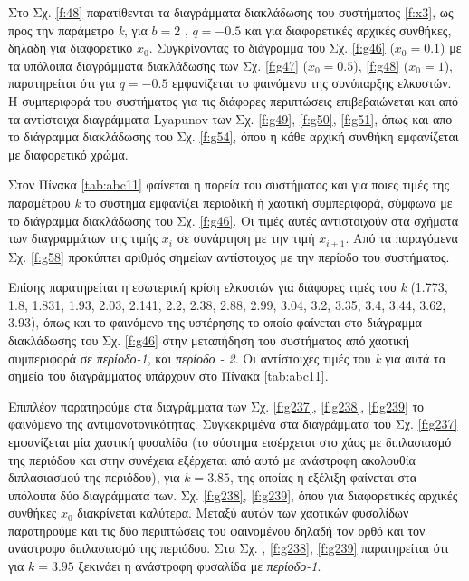 Στο Σχ. \ref{f:48} παρατίθενται τα διαγράμματα διακλάδωσης του συστήματος \ref{f:x3}, ως προς την παράμετρο \emph{k}, για $b = 2$ , $q =-0.5$ και για διαφορετικές αρχικές συνθήκες, δηλαδή για διαφορετικό \(x_0\). Συγκρίνοντας το διάγραμμα του Σχ. \ref{f:g46} (\(x_0=0.1\)) με τα υπόλοιπα διαγράμματα διακλάδωσης των Σχ. \ref{f:g47} (\(x_0=0.5\)), \ref{f:g48} (\(x_0=1\)), παρατηρείται ότι για $q=-0.5$ εμφανίζεται το φαινόμενο της συνύπαρξης ελκυστών. Η συμπεριφορά του συστήματος για τις διάφορες περιπτώσεις επιβεβαιώνεται και από τα αντίστοιχα διαγράμματα Lyapunov των Σχ. \ref{f:g49}, \ref{f:g50}, \ref{f:g51}, όπως και απο το διάγραμμα διακλάδωσης του Σχ. \ref{f:g54}, όπου η κάθε αρχική συνθήκη εμφανίζεται με διαφορετικό χρώμα.

Στον Πίνακα \ref{tab:abc11} φαίνεται η πορεία του συστήματος και για ποιες τιμές της παραμέτρου \emph{k} το σύστημα εμφανίζει περιοδική ή χαοτική συμπεριφορά, σύμφωνα με το διάγραμμα διακλάδωσης του Σχ. \ref{f:g46}. Οι τιμές αυτές αντιστοιχούν στα σχήματα των διαγραμμάτων της τιμής \(x_i\) σε συνάρτηση με την τιμή \(x_{i+1}\). Από τα παραγόμενα Σχ. \ref{f:g58} προκύπτει αριθμός σημείων αντίστοιχος με την περίοδο του συστήματος.

Επίσης παρατηρείται η εσωτερική κρίση ελκυστών για διάφορες τιμές του \emph{k} (1.773, 1.8, 1.831, 1.93, 2.03, 2.141, 2.2, 2.38,
2.88, 2.99, 3.04, 3.2, 3.35, 3.4, 3.44, 3.62, 3.93), όπως και το φαινόμενο της υστέρησης το οποίο φαίνεται στο διάγραμμα διακλάδωσης του Σχ. \ref{f:g46} στην μεταπήδηση του συστήματος από χαοτική συμπεριφορά σε \emph{περίοδο-1}, και \emph{περίοδο - 2}. Οι αντίστοιχες τιμές του \emph{k} για αυτά τα σημεία του διαγράμματος υπάρχουν στο Πίνακα \ref{tab:abc11}.

Επιπλέον παρατηρούμε στα διαγράμματα των Σχ. \ref{f:g237}, \ref{f:g238}, \ref{f:g239} το φαινόμενο της αντιμονοτονικότητας. Συγκεκριμένα στα διαγράμματα του Σχ. \ref{f:g237} εμφανίζεται μία χαοτική φυσαλίδα (το σύστημα εισέρχεται στο χάος με διπλασιασμό της περιόδου και στην συνέχεια εξέρχεται από αυτό με ανάστροφη ακολουθία διπλασιασμού της περιόδου), για $k=3.85$, της οποίας η εξέλιξη φαίνεται στα υπόλοιπα δύο διαγράμματα των. Σχ. \ref{f:g238}, \ref{f:g239}, όπου για διαφορετικές αρχικές συνθήκες $x_0$ διακρίνεται καλύτερα.
Μεταξύ αυτών των χαοτικών φυσαλίδων παρατηρούμε και τις δύο περιπτώσεις του φαινομένου δηλαδή τον ορθό και τον ανάστροφο διπλασιασμό της περιόδου.%
Στα Σχ. , \ref{f:g238}, \ref{f:g239} παρατηρείται ότι για $k=3.95$ ξεκινάει η ανάστροφη φυσαλίδα με \emph{περίοδο-1}.

